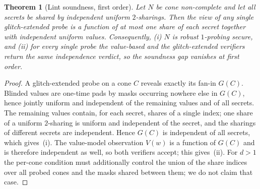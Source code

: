 \documentclass[lettersize,journal]{IEEEtran}
\newtheorem{theorem}{Theorem}
\begin{document}
\begin{theorem}[Lint soundness, first order]
\label{thm:lint-sound}
Let $N$ be cone non-complete and let all secrets be shared by independent
uniform $2$-sharings. Then the view of any single glitch-extended probe is a
function of at most one share of each secret together with independent
uniform values. Consequently, (i) $N$ is robust $1$-probing secure, and
(ii) for every single probe the value-based and the glitch-extended
verifiers return the same independence verdict, so the soundness gap
vanishes at first order.
\end{theorem}
\begin{proof}
A glitch-extended probe on a cone $C$ reveals exactly its fan-in $G(C)$.
Blinded values are one-time pads by masks occurring nowhere else in $G(C)$,
hence jointly uniform and independent of the remaining values and of all
secrets. The remaining values contain, for each secret, shares of a single
index; one share of a uniform $2$-sharing is uniform and independent of the
secret, and the sharings of different secrets are independent. Hence $G(C)$ is
independent of all secrets, which gives~(i). The value-model observation
$V(w)$ is a function of $G(C)$ and is therefore independent as well, so both
verifiers accept; this gives~(ii). For $d>1$ the per-cone condition must
additionally control the union of the share indices over all probed cones and
the masks shared between them; we do not claim that case.
\end{proof}
\end{document}

